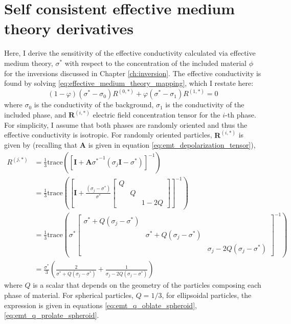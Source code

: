 \chapter{Self consistent effective medium theory derivatives}
\label{app:scemt-derivs}

Here, I derive the sensitivity of the effective conductivity calculated via effective medium theory, $\sigma^*$ with respect to the concentration of the included material $\phi$ for the inversions discussed in Chapter \ref{ch:inversion}. The effective conductivity is found by solving \ref{eq:effective_medium_theory_mapping}, which I restate here:
\begin{equation}
    (1-\varphi)(\sigma^* - \sigma_0)R^{(0,*)} + \varphi(\sigma^* - \sigma_1)R^{(1,*)}= 0
\label{eq:emt_mapping}
\end{equation}
where $\sigma_0$ is the conductivity of the background, $\sigma_1$ is the conductivity of the included phase, and $\mathbf{R}^{(i,*)}$ electric field concentration tensor for the $i$-th phase. For simplicity, I assume that both phases are randomly oriented and thus the effective conductivity is isotropic. For randomly oriented particles, $\mathbf{R}^{(i,*)}$ is given by (recalling that $\mathbf{A}$ is given in equation \ref{eq:emt_depolarization_tensor}),
\begin{equation}
\begin{split}
    R^{(j,*)}
    &= \frac{1}{3}\text{trace}\left(
        \left[\mathbf{I}+\mathbf{A}{\sigma^*}^{-1}(\sigma_j\mathbf{I}-\sigma^*)\right]^{-1}
        \right)\\
    &= \frac{1}{3}\text{trace}\left(
        \left[\mathbf{I} +
        \frac{(\sigma_j-\sigma^*)}{\sigma^*}\left[\begin{array}{ccc}
            Q & & \\
            & Q & \\
            & & 1-2Q
        \end{array}\right]
        \right]^{-1}
        \right) \\
    & = \frac{1}{3}\text{trace}\left(
            \sigma^*\left[\begin{array}{ccc}
            \sigma^* + Q(\sigma_j - \sigma^*) & & \\
            & \sigma^* + Q(\sigma_j - \sigma^*) & \\
            & & \sigma_j - 2Q(\sigma_j - \sigma^*)
        \end{array}
            \right]^{-1}
        \right) \\
    & =\frac{\sigma^*}{3}\left( \frac{2}{\sigma^* + Q(\sigma_j - \sigma^*)} + \frac{1}{\sigma_j - 2Q(\sigma_j - \sigma^*)}\right)
\end{split}
\label{eq:emt_r_random}
\end{equation}
where $Q$ is a scalar that depends on the geometry of the particles composing each phase of material. For spherical particles, $Q=1/3$, for ellipsoidal particles, the expression is given in equations \ref{eq:emt_q_oblate_spheroid}, \ref{eq:emt_q_prolate_spheroid}.

